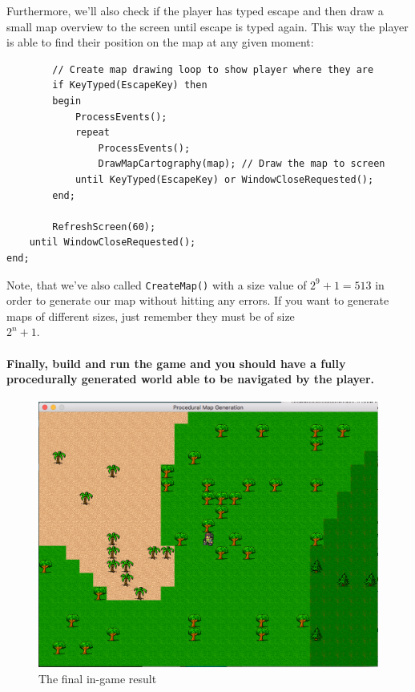 \documentclass{article}
\begin{document}
Furthermore, we'll also check if the player has typed escape and then draw a small map overview to the screen until escape is typed again. This way the player is able to find their position on the map at any given moment:

\begin{verbatim}
		// Create map drawing loop to show player where they are
		if KeyTyped(EscapeKey) then
		begin
			ProcessEvents();
			repeat
				ProcessEvents();
				DrawMapCartography(map); // Draw the map to screen
			until KeyTyped(EscapeKey) or WindowCloseRequested();
		end;

		RefreshScreen(60);
	until WindowCloseRequested();
end;
\end{verbatim}

Note, that we've also called \texttt{CreateMap()} with a size value of $2^{9}+1 = 513$ in order to generate our map without hitting any errors. If you want to generate maps of different sizes, just remember they must be of size 
\\
$2^{n}+1$.

\paragraph{Finally, build and run the game and you should have a fully procedurally generated world able to be navigated by the player.}\mbox{}

\begin{figure}[H]
	\centering
	\includegraphics[width=0.9\linewidth,trim=4 4 4 4,clip]{finalresult.png}
	\renewcommand{\figurename}{Example}
	\caption{The final in-game result}
\end{figure}
\end{document}
